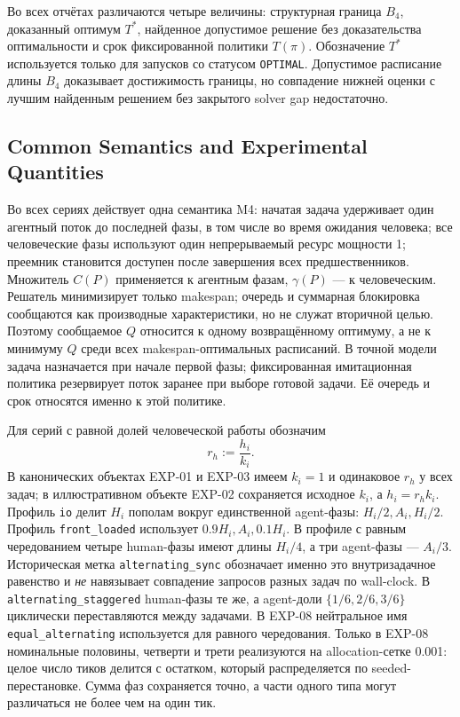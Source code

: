 \FloatBarrier

Во всех отчётах различаются четыре величины: структурная граница $B_4$,
доказанный оптимум $T^*$, найденное допустимое решение без доказательства
оптимальности и срок фиксированной политики $T(\pi)$. Обозначение $T^*$
используется только для запусков со статусом \texttt{OPTIMAL}. Допустимое
расписание длины $B_4$ доказывает достижимость границы, но совпадение нижней
оценки с лучшим найденным решением без закрытого solver gap недостаточно.

\subsection{Common Semantics and Experimental Quantities}

Во всех сериях действует одна семантика M4: начатая задача удерживает один
агентный поток до последней фазы, в том числе во время ожидания человека; все
человеческие фазы используют один непрерываемый ресурс мощности 1; преемник
становится доступен после завершения всех предшественников. Множитель $C(P)$
применяется к агентным фазам, $\gamma(P)$ --- к человеческим. Решатель
минимизирует только makespan; очередь и суммарная блокировка сообщаются как
производные характеристики, но не служат вторичной целью. Поэтому сообщаемое
$Q$ относится к одному возвращённому оптимуму, а не к минимуму $Q$ среди всех
makespan-оптимальных расписаний. В точной модели задача назначается при начале
первой фазы; фиксированная имитационная политика резервирует поток заранее при
выборе готовой задачи. Её очередь и срок относятся именно к этой политике.

Для серий с равной долей человеческой работы обозначим
\[
  r_h:=\frac{h_i}{k_i}.
\]
В канонических объектах EXP-01 и EXP-03 имеем $k_i=1$ и одинаковое $r_h$ у
всех задач; в иллюстративном объекте EXP-02 сохраняется исходное $k_i$, а
$h_i=r_hk_i$. Профиль \texttt{io} делит $H_i$ пополам вокруг единственной
agent-фазы: $H_i/2,A_i,H_i/2$. Профиль \texttt{front\_loaded} использует
$0.9H_i,A_i,0.1H_i$. В профиле с равным чередованием четыре human-фазы имеют
длины $H_i/4$, а три agent-фазы --- $A_i/3$. Историческая метка
\texttt{alternating\_sync} обозначает именно это внутризадачное равенство и
\emph{не} навязывает совпадение запросов разных задач по wall-clock. В
\texttt{alternating\_staggered} human-фазы те же, а agent-доли
$\{1/6,2/6,3/6\}$ циклически переставляются между задачами. В EXP-08
нейтральное имя \texttt{equal\_alternating} используется для равного
чередования. Только в EXP-08 номинальные половины, четверти и трети
реализуются на allocation-сетке 0.001: целое число тиков делится с остатком,
который распределяется по seeded-перестановке. Сумма фаз сохраняется точно, а
части одного типа могут различаться не более чем на один тик.

